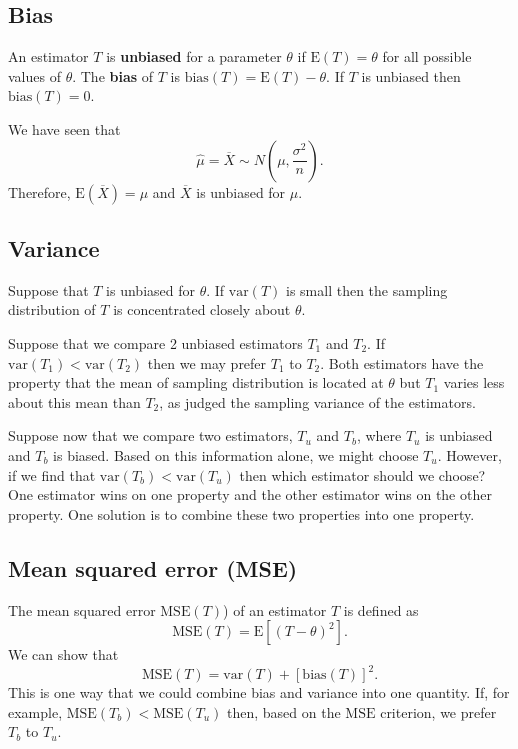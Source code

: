 \documentclass[
  british,
  11pt,
  openany, a4paper]{book}
\begin{document}
\subsection{Bias}\label{bias}

An estimator \(T\) is \textbf{unbiased} for a parameter \(\theta\) if \(\text{E}(T)=\theta\) for all possible values of \(\theta\). The \textbf{bias} of \(T\) is \(\text{bias}(T)=\text{E}(T)-\theta\). If \(T\) is unbiased then \(\text{bias}(T)=0\).

We have seen that
\[\hat{\mu} =\overline{X} \sim N\left(\mu,\frac{\sigma^2}{n}\right).\]
Therefore, \(\text{E}(\overline{X}) = \mu\) and \(\overline{X}\) is unbiased for \(\mu\).

\subsection{Variance}\label{varianceofestimator}

Suppose that \(T\) is unbiased for \(\theta\). If \(\text{var}(T)\) is small then the sampling distribution of \(T\) is concentrated closely about \(\theta\).

Suppose that we compare 2 unbiased estimators \(T_1\) and \(T_2\). If \(\text{var}(T_1) < \text{var}(T_2)\) then we may prefer \(T_1\) to \(T_2\). Both estimators have the property that the mean of sampling distribution is located at \(\theta\) but \(T_1\) varies less about this mean than \(T_2\), as judged the sampling variance of the estimators.

Suppose now that we compare two estimators, \(T_u\) and \(T_b\), where \(T_u\) is unbiased and \(T_b\) is biased. Based on this information alone, we might choose \(T_u\). However, if we find that \(\text{var}(T_b) < \text{var}(T_u)\) then which estimator should we choose? One estimator wins on one property and the other estimator wins on the other property. One solution is to combine these two properties into one property.

\subsection{Mean squared error (MSE)}\label{mean-squared-error-mse}

The mean squared error \(\text{MSE}(T)\)) of an estimator \(T\) is defined as
\[ \text{MSE}(T) = \text{E}[(T - \theta)^2]. \]
We can show that
\begin{equation}
\text{MSE}(T) = \text{var}(T) + [\text{bias}(T)] ^ 2. 
\label{eq:mse}
\end{equation}
This is one way that we could combine bias and variance into one quantity. If, for example, \(\text{MSE}(T_b) < \text{MSE}(T_u)\) then, based on the \(\text{MSE}\) criterion, we prefer \(T_b\) to \(T_u\).
\end{document}
